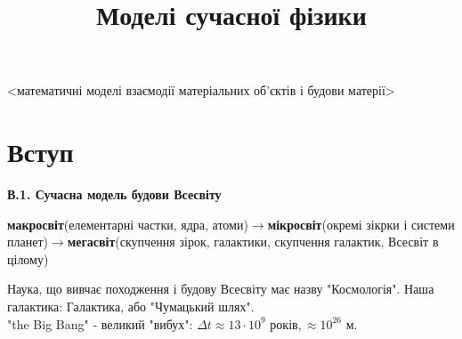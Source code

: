 \documentclass[a4paper,12pt]{article}
\begin{document}
\title{Моделі сучасної фізики}
\maketitle
\date{ }
<математичні моделі взаємодії матеріальних об'єктів і будови матерії>

\newpage
\tableofcontents
\newpage
\section{Вступ}
\textbf{В.1. Сучасна модель будови Всесвіту}

\textbf{макросвіт}(елементарні частки, ядра, атоми)$\rightarrow$\textbf{мікросвіт}(окремі зікрки і системи планет)$\rightarrow$\textbf{мегасвіт}(скупчення зірок, галактики, скупчення галактик, Всесвіт в цілому)

Наука, що вивчає походження і будову Всесвіту має назву "Космологія".
Наша галактика: Галактика, або "Чумацький шлях".
\\"the Big Bang" - великий "вибух": $\Delta t\approx 13\cdot 10^9 \textrm{ років}, \approx 10^{26}\textrm{ м}.$
\end{document}
